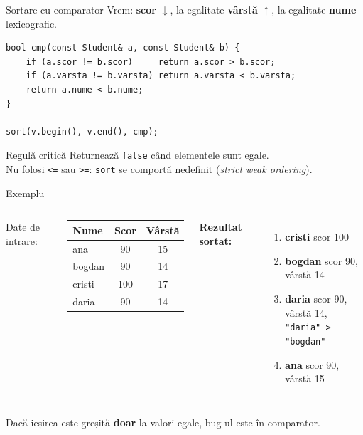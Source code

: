 ﻿\documentclass{beamer}
\begin{document}
\begin{frame}[fragile]{Sortare cu comparator}
  Vrem: \textbf{scor} $\downarrow$,
  la egalitate \textbf{vârstă} $\uparrow$,
  la egalitate \textbf{nume} lexicografic.

  \begin{lstlisting}
bool cmp(const Student& a, const Student& b) {
    if (a.scor != b.scor)     return a.scor > b.scor;
    if (a.varsta != b.varsta) return a.varsta < b.varsta;
    return a.nume < b.nume;
}

sort(v.begin(), v.end(), cmp);
  \end{lstlisting}

  \begin{alertblock}{Regulă critică}
    Returnează \texttt{false} când elementele sunt egale. \\
    Nu folosi \texttt{<=} sau \texttt{>=}: \texttt{sort} se comportă
    nedefinit (\emph{strict weak ordering}).
  \end{alertblock}
\end{frame}

\begin{frame}{Exemplu}
  \begin{columns}[T]
    Date de intrare:
    \begin{center}
    \begin{tabular}{lcc}
      \toprule
      Nume & Scor & Vârstă \\
      \midrule
      ana    & 90  & 15 \\
      bogdan & 90  & 14 \\
      cristi & 100 & 17 \\
      daria  & 90  & 14 \\
      \bottomrule
    \end{tabular}
    \end{center}

    \textbf{Rezultat sortat:}
    \begin{enumerate}\itemsep6pt
      \item \textbf{cristi} \textemdash{} scor 100
      \item \textbf{bogdan} \textemdash{} scor 90, vârstă 14
      \item \textbf{daria} \textemdash{} scor 90, vârstă 14,\\
            \texttt{"daria" > "bogdan"}
      \item \textbf{ana} \textemdash{} scor 90, vârstă 15
    \end{enumerate}
  \end{columns}

  \medskip

  Dacă ieșirea este greșită \textbf{doar} la valori egale, bug-ul este
  în comparator.
\end{frame}
\end{document}

